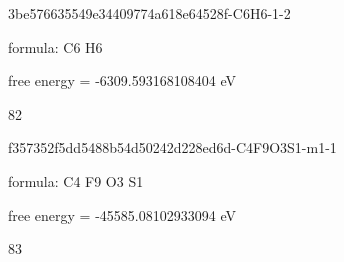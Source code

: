 \documentclass{article}
\begin{document}
\vspace{1cm}


3be576635549e34409774a618e64528f-C6H6-1-2



formula: C6 H6



free energy = -6309.593168108404 eV

82

\vspace{1cm}


f357352f5dd5488b54d50242d228ed6d-C4F9O3S1-m1-1



formula: C4 F9 O3 S1



free energy = -45585.08102933094 eV

83
\end{document}
